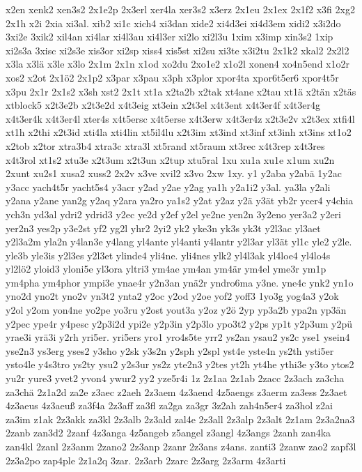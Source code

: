 {x2en
xenk2
xen3s2
2x1e2p
2x3erl
xer4la
xer3s2
x3erz
2x1eu
2x1ex
2x1f2
x3fi
2xg2
2x1h
x2i
2xia
xi3al.
xib2
xi1c
xich4
xi3dan
xide2
xi4d3ei
xi4d3em
xidi2
x3i2do
3xi2e
3xik2
xil4an
xi4lar
xi4l3au
xi4l3er
xi2lo
xi2l3u
1xim
x3imp
xin3s2
1xip
xi2s3a
3xisc
xi2s3e
xis3or
xi2sp
xiss4
xis5st
xi2su
xi3te
x3i2tu
2x1k2
xkal2
2x2l2
x3la
x3lä
x3le
x3lo
2x1m
2x1n
x1od
xo2du
2xo1e2
x1o2l
xonen4
xo4n5end
x1o2r
xos2
x2ot
2x1ö2
2x1p2
x3par
x3pau
x3ph
x3plor
xpor4ta
xpor6t5er6
xpor4t5r
x3pu
2x1r
2x1s2
x3sh
xst2
2x1t
xt1a
x2ta2b
x2tak
xt4ane
x2tau
xt1ä
x2tän
x2täs
xtblock5
x2t3e2b
x2t3e2d
x4t3eig
xt3ein
x2t3el
x4t3ent
x4t3er4f
x4t3er4g
x4t3er4k
x4t3er4l
xter4s
x4t5ersc
x4t5erse
x4t3erw
x4t3er4z
x2t3e2v
x2t3ex
xtfi4l
xt1h
x2thi
x2t3id
xti4la
xti4lin
xt5il4lu
x2t3im
xt3ind
xt3inf
xt3inh
xt3ins
xt1o2
x2tob
x2tor
xtra3b4
xtra3c
xtra3l
xt5rand
xt5raum
xt3rec
x4t3rep
x4t3res
x4t3rol
xt1s2
xtu3e
x2t3um
x2t3un
x2tup
xtu5ral
1xu
xu1a
xu1e
x1um
xu2n
2xunt
xu2s1
xusa2
xuss2
2x2v
x3ve
xvil2
x3vo
2xw
1xy.
y1
y2aba
y2abä
1y2ac
y3acc
yach4t5r
yacht5s4
y3acr
y2ad
y2ae
y2ag
ya1h
y2a1i2
y3al.
ya3la
y2ali
y2ana
y2ane
yan2g
y2aq
y2ara
ya2ro
ya1s2
y2at
y2az
y2ä
y3ät
yb2r
ycer4
y4chia
ych3n
yd3al
ydri2
ydrid3
y2ec
ye2d
y2ef
y2el
ye2ne
yen2n
3y2eno
yer3a2
y2eri
yer2n3
yes2p
y3e2st
yf2
yg2l
yhr2
2yi2
yk2
yke3n
yk3s
yk3t
y2l3ac
yl3aet
y2l3a2m
yla2n
y4lan3e
y4lang
yl4ante
yl4anti
y4lantr
y2l3ar
yl3ät
yl1c
yle2
y2le.
yle3b
yle3is
y2l3es
y2l3et
ylinde4
yli4ne.
yli4nes
ylk2
yl4l3ak
yl4loe4
yl4lo4s
yl2lö2
yloid3
yloni5e
yl3ora
yltri3
ym4ae
ym4an
ym4är
ym4el
yme3r
ym1p
ym4pha
ym4phor
ympi3e
ynae4r
y2n3an
ynä2r
yndro6ma
y3ne.
yne4c
ynk2
yn1o
yno2d
yno2t
yno2v
yn3t2
ynta2
y2oc
y2od
y2oe
yof2
yoff3
1yo3g
yog4a3
y2ok
y2ol
y2om
yon4ne
yo2pe
yo3ru
y2ost
yout3a
y2oz
y2ö
2yp
yp3a2b
ypa2n
yp3än
y2pec
ype4r
y4pesc
y2p3i2d
ypi2e
y2p3in
y2p3lo
ypo3t2
y2ps
yp1t
y2p3um
y2pü
yrae3i
yrä3i
y2rh
yri5er.
yri5ers
yro1
yro4s5te
yrr2
ys2an
ysau2
ys2c
yse1
ysein4
yse2n3
ys3erg
yses2
y3sho
y2sk
y3s2n
y2sph
y2spl
yst4e
yste4n
ys2th
ysti5er
ysto4le
y4s3tro
ys2ty
ysu2
y2s3ur
ys2z
yte2n3
y2tes
yt2h
yt4he
ythi3e
y3to
ytos2
yu2r
yure3
yvet2
yvon4
ywur2
yy2
yze5r4i
1z
2z1aa
2z1ab
2zacc
2z3ach
za3cha
za3chä
2z1a2d
za2e
z3aec
z2aeh
2z3aem
4z3aend
4z5aengs
z3aerm
za3ess
2z3aet
4z3aeus
4z3aeuß
za3f4a
2z3aff
za3fl
za2ga
za3gr
3z2ah
zah4n5er4
za3hol
z2ai
za3im
z1ak
2z3akk
za3kl
2z3alb
2z3ald
zal4e
2z3all
2z3alp
2z3alt
2z1am
2z3a2na3
2zanb
zan3d2
2zanf
4z3anga
4z5angeb
z5angel
z3angl
4z3angs
2zanh
zan4ka
zan4kl
2zanl
2z3anm
2zano2
2z3anp
2zanr
2z3ans
z4ans.
zanti3
2zanw
zao2
zapf3l
2z3a2po
zap4ple
2z1a2q
3zar.
2z3arb
2zarc
2z3arg
2z3arm
4z3arti
}

